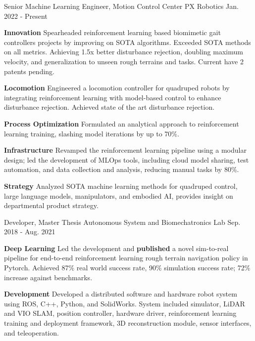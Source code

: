\begin{cventries}
	\cventry
	{Senior Machine Learning Engineer, Motion Control Center}
	{PX Robotics}
	{Jan. 2022 - Present}
	{}
	{
		\begin{cvitems}
			\item {
				\textbf{Innovation} Spearheaded reinforcement learning based biomimetic gait controllers projects by improving on SOTA algorithms. Exceeded SOTA methods on all metrics. Achieving 1.5x better disturbance rejection, doubling maximum velocity, and generalization to unseen rough terrains and tasks. Current have 2 patents pending.
			}
			\item {
				\textbf{Locomotion} Engineered a locomotion controller for quadruped robots by integrating reinforcement learning with model-based control to enhance disturbance rejection. Achieved state of the art disturbance rejection.
			}
			\item {
				\textbf{Process Optimization} Formulated an analytical approach to reinforcement learning training, slashing model iterations by up to 70\%.
			}
			\item {
				\textbf{Infrastructure} Revamped the reinforcement learning pipeline using a modular design; led the development of MLOps tools, including cloud model sharing, test automation, and data collection and analysis, reducing manual tasks by 80\%.
			}
			\item {
				\textbf{Strategy} Analyzed SOTA machine learning methods for quadruped control, large language models, manipulators, and embodied AI, provides insight on departmental product strategy.
			}
		\end{cvitems}
	}
	\cventry
	{Developer, Master Thesis}
	{Autonomous System and Biomechatronics Lab}
	{Sep. 2018 - Aug. 2021}
	{}
	{
		\begin{cvitems}
			\item {
				\textbf{Deep Learning} Led the development and \textbf{published} a novel sim-to-real pipeline for end-to-end reinforcement learning rough terrain navigation policy in Pytorch. Achieved 87\% real world success rate, 90\% simulation success rate; 72\% increase against benchmarks.
			}
			\item {
				\textbf{Development} Developed a distributed software and hardware robot system using ROS, C++, Python, and SolidWorks. System included simulator, LiDAR and VIO SLAM, position controller, hardware driver, reinforcement learning training and deployment framework, 3D reconstruction module, sensor interfaces, and teleoperation.
}
\end{cvitems}}
\end{cventries}
